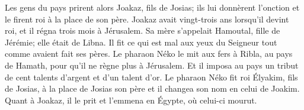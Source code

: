 Les gens du pays prirent alors Joakaz, fils de Josias;
	ils lui donnèrent l’onction et le firent roi à la place de son père.
Joakaz avait vingt-trois ans lorsqu’il devint roi, et il régna trois mois à Jérusalem.
	Sa mère s’appelait Hamoutal, fille de Jérémie; elle était de Libna.
Il fit ce qui est mal aux yeux du Seigneur tout comme avaient fait ses pères.
Le pharaon Néko le mit aux fers à Ribla, au pays de Hamath,
	pour qu’il ne règne plus à Jérusalem.
	Et il imposa au pays un tribut de cent talents d’argent et d’un talent d’or.
Le pharaon Néko fit roi Élyakim, fils de Josias, à la place de Josias son père
	et il changea son nom en celui de Joakim.
Quant à Joakaz, il le prit et l’emmena en Égypte, où celui-ci mourut.
